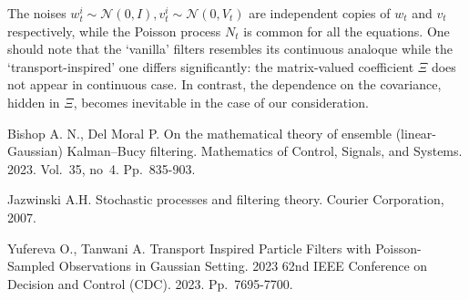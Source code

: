 \documentclass[12pt]{llncs}
\begin{document}
The noises 
$w^i_t\sim \mathcal{N}(0,I), v^i_t\sim \mathcal{N}(0,V_t)$ are independent copies of $w_t$ and $v_t$ respectively, while the Poisson process $N_t$ is common for all the equations. 
One should note that the `vanilla' filters resembles its continuous analoque while the `transport-inspired' one differs significantly: the matrix-valued coefficient $\Xi$ does not appear in continuous case. In contrast, the dependence on the covariance, hidden in  $\Xi$, becomes inevitable in the case of our consideration.


\begin{thebibliography}{9} %

 Bishop A. N., Del Moral P. On the mathematical theory of ensemble (linear-Gaussian) Kalman–Bucy filtering. Mathematics of Control, Signals, and Systems. 2023. Vol.~35, no~4. Pp.~835-903.

 Jazwinski A.H. Stochastic processes and filtering theory. Courier Corporation, 2007.

 Yufereva O., Tanwani A. Transport Inspired Particle Filters with Poisson-Sampled Observations in Gaussian Setting. 2023 62nd IEEE Conference on Decision and Control (CDC). 2023. Pp.~7695-7700.

\end{thebibliography}
\end{document}
